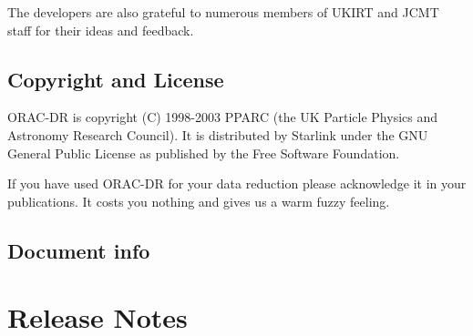 \documentclass[twoside,11pt]{article}
\renewcommand{\_}{\texttt{\symbol{95}}}
\begin{document}
The developers are also grateful to numerous members of UKIRT and JCMT
staff for their ideas and feedback.

\subsection*{Copyright and License\label{ORAC-DR_Copyright_and_License}}


ORAC-DR is copyright (C) 1998-2003 PPARC (the UK Particle Physics and Astronomy
Research Council). It is distributed by Starlink under the
GNU General Public License as published by the Free Software Foundation.



If you have used ORAC-DR for your data reduction please acknowledge it
in your publications.  It costs you nothing and gives us a warm fuzzy
feeling.

\subsection*{Document info\label{ORAC-DR_Document_info}}

\section{Release Notes}
\end{document}
